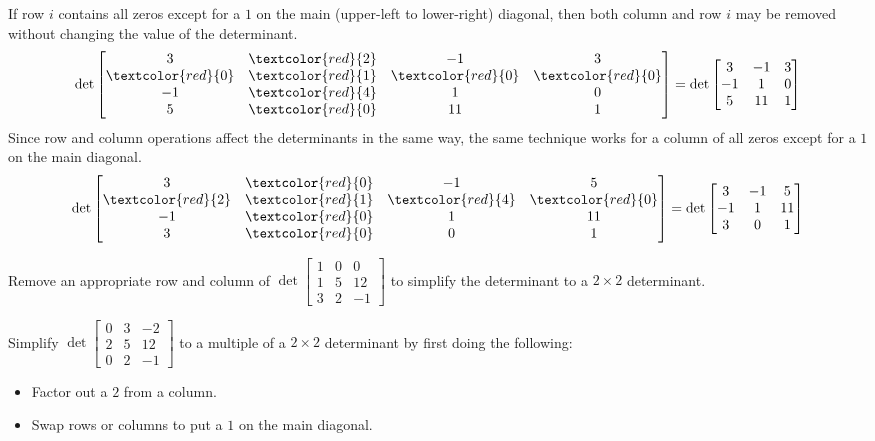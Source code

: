 \begin{fact}
If row \(i\) contains all zeros except for a \(1\) on the 
main (upper-left to lower-right) diagonal, 
then both column and row \(i\)
may be removed without changing the value of the determinant.
\[
  \det \begin{bmatrix}
    3 & \textcolor{red}{2} & -1 & 3 \\
    \textcolor{red}{0} & \textcolor{red}{1} 
      & \textcolor{red}{0} & \textcolor{red}{0} \\
    -1 & \textcolor{red}{4} & 1 & 0 \\
    5 & \textcolor{red}{0} & 11 & 1
  \end{bmatrix} =
  \det \begin{bmatrix}
    3 & -1 & 3 \\
    -1 & 1 & 0 \\
    5 & 11 & 1
  \end{bmatrix}
\]
Since row and column operations affect the determinants in the same
way, the same technique works for a column of all zeros except for
a \(1\) on the main diagonal.
\[
  \det \begin{bmatrix}
    3 & \textcolor{red}{0} & -1 & 5 \\
    \textcolor{red}{2} & \textcolor{red}{1} & \textcolor{red}{4} & 
       \textcolor{red}{0} \\
    -1 & \textcolor{red}{0} & 1 & 11 \\
    3 & \textcolor{red}{0} & 0 & 1
  \end{bmatrix} =
  \det \begin{bmatrix}
    3 & -1 & 5 \\
    -1 & 1 & 11 \\
    3 & 0 & 1
  \end{bmatrix}
\] 
\end{fact}


\begin{activity}{5}
  Remove an appropriate row and column of  
  \(\det \begin{bmatrix} 1 & 0 & 0 \\ 1 & 5 & 12 \\ 3 & 2 & -1 \end{bmatrix}\)
  to simplify the determinant to a \(2\times 2\) determinant.
\end{activity}

\begin{activity}{5}
  Simplify
  \(\det \begin{bmatrix} 0 & 3 & -2 \\ 2 & 5 & 12 \\ 0 & 2 & -1 \end{bmatrix}\)
  to a multiple of a \(2\times 2\) determinant by first doing the following:
  \begin{itemize}
    \item Factor out a \(2\) from a column.
    \item Swap rows or columns to put a \(1\) on the main diagonal.
  \end{itemize}
\end{activity}

